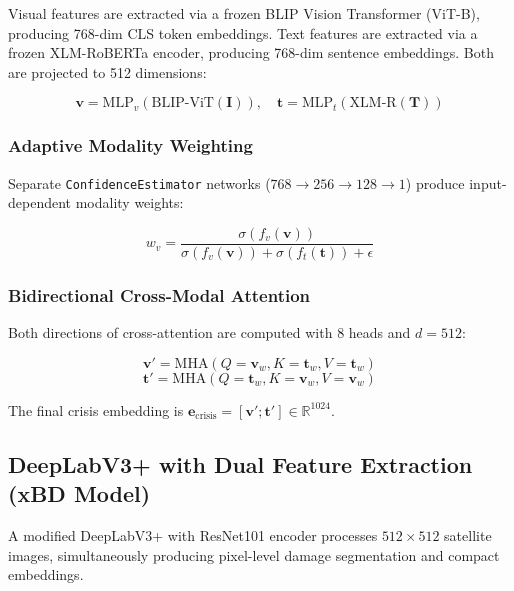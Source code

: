 \documentclass[journal]{IEEEtran}
\begin{document}
Visual features are extracted via a frozen BLIP Vision Transformer (ViT-B), producing 768-dim CLS token embeddings. Text features are extracted via a frozen XLM-RoBERTa encoder, producing 768-dim sentence embeddings. Both are projected to 512 dimensions:

\begin{equation}
\mathbf{v} = \text{MLP}_v(\text{BLIP-ViT}(\mathbf{I})), \quad \mathbf{t} = \text{MLP}_t(\text{XLM-R}(\mathbf{T}))
\end{equation}

\subsubsection{Adaptive Modality Weighting}

Separate \texttt{ConfidenceEstimator} networks ($768 \to 256 \to 128 \to 1$) produce input-dependent modality weights:

\begin{equation}
w_v = \frac{\sigma(f_v(\mathbf{v}))}{\sigma(f_v(\mathbf{v})) + \sigma(f_t(\mathbf{t})) + \epsilon}
\end{equation}

\subsubsection{Bidirectional Cross-Modal Attention}

Both directions of cross-attention are computed with 8 heads and $d=512$:

\begin{equation}
\mathbf{v}' = \text{MHA}(Q{=}\mathbf{v}_w, K{=}\mathbf{t}_w, V{=}\mathbf{t}_w)
\end{equation}
\begin{equation}
\mathbf{t}' = \text{MHA}(Q{=}\mathbf{t}_w, K{=}\mathbf{v}_w, V{=}\mathbf{v}_w)
\end{equation}

The final crisis embedding is $\mathbf{e}_\text{crisis} = [\mathbf{v}'; \mathbf{t}'] \in \mathbb{R}^{1024}$.

\subsection{DeepLabV3+ with Dual Feature Extraction (xBD Model)}

A modified DeepLabV3+ with ResNet101 encoder processes $512 \times 512$ satellite images, simultaneously producing pixel-level damage segmentation and compact embeddings.
\end{document}
